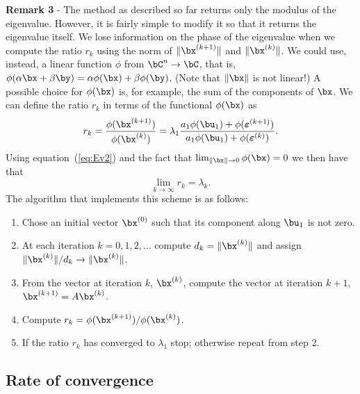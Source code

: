 \smallskip

\noindent
\textbf{Remark 3} - The method as described so far returns only the
modulus of the eigenvalue.  However, it is fairly simple to modify it
so that it returns the eigenvalue itself.  We lose information on the
phase of the eigenvalue when we compute the ratio $r_k$ using the norm
of $\| \bx^{(k+1)}\|$ and $\| \bx^{(k)}\|$. We could use, instead, a
linear function $\phi$ from $\bC^n \to \bC$, that is, $\phi(\alpha \bx
+ \beta \by) = \alpha \phi(\bx) + \beta \phi(\by)$. (Note that
$\|\bx\|$ is not linear!)  A possible choice for $\phi(\bx)$ is, for
example, the sum of the components of $\bx$.  We can define the ratio
$r_k$ in terms of the functional $\phi(\bx)$ as
%
\begin{equation}
 r_k = \frac{\phi( \bx^{(k+1)} )}{\phi(\bx^{(k)})} = \lambda_1
        \frac{a_1 \phi(\bu_1) + \phi(\boldsymbol{\varepsilon}^{(k+1)})}
             {a_1 \phi(\bu_1) + \phi(\boldsymbol{\varepsilon}^{(k)})} .
 \label{eq:Ev7}
\end{equation}
%
Using equation~(\ref{eq:Ev2}) and the fact that $\lim_{\| \bx \| \to
  0} \phi(\bx) = 0$ we then have that
%
\begin{equation*}
 \lim_{k \to \infty} r_k = \lambda_k.
\end{equation*}
%
The algorithm that implements this scheme is as follows:

\begin{enumerate}
\item Chose an initial vector $\bx^{(0)}$ such that its
  component along $\bu_1$ is not zero.
\item At each iteration $k=0,1,2,\ldots$ compute $d_k = \|
  \bx^{(k)}\|$ and assign $\| \bx^{(k)}\|/d_k \to \| \bx^{(k)}\|$.
\item From the vector at iteration $k$, $\bx^{(k)}$, compute the
  vector at iteration $k+1$, $\bx^{(k+1)} = A \bx^{(k)}$.
\item Compute  $r_k = \phi(\bx^{(k+1)})/\phi(\bx^{(k)})$.
\item If the ratio $r_k$ has converged to $\lambda_1$ stop;
  otherwise repeat from step 2.
\end{enumerate}

\subsection{Rate of convergence}

